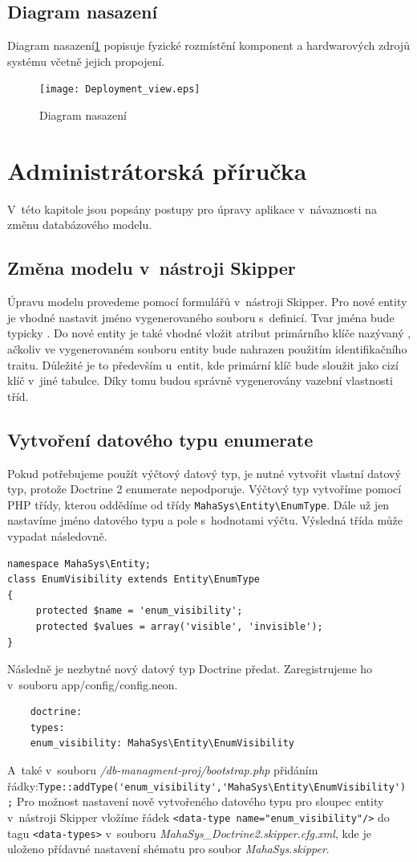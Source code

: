 \documentclass[thesis=B,czech]{FITthesis}[2012/06/26]
\begin{document}
\subsection{Diagram nasazení}
	Diagram nasazení\ref{deployment_view} popisuje fyzické rozmístění komponent a hardwarových zdrojů systému včetně jejich propojení.\cite{si1_pred7}

\begin{figure}
	\texttt{[image: Deployment\_view.eps]}
	\caption{Diagram nasazení}\label{deployment_view}
\end{figure}
	
\section{Administrátorská příručka}
	V~této kapitole jsou popsány postupy pro úpravy aplikace v~návaznosti na změnu databázového modelu.
\subsection{Změna modelu v~nástroji Skipper}
	Úpravu modelu provedeme pomocí formulářů v~nástroji Skipper. Pro nové entity je vhodné nastavit jméno vygenerovaného souboru s~definicí. Tvar jména bude typicky . Do nové entity je také vhodné vložit atribut primárního klíče nazývaný , ačkoliv ve vygenerovaném souboru entity bude nahrazen použitím identifikačního traitu. Důležité je to především u~entit, kde primární klíč bude sloužit jako cizí klíč v~jiné tabulce. Díky tomu budou správně vygenerovány vazební vlastnosti tříd.
\subsection{Vytvoření datového typu enumerate}
	Pokud potřebujeme použít výčtový datový typ, je nutné vytvořit vlastní datový typ, protože Doctrine 2 enumerate nepodporuje. Výčtový typ vytvoříme pomocí PHP třídy, kterou oddědíme od třídy \verb|MahaSys\Entity\EnumType|. Dále už jen nastavíme jméno datového typu a pole s~hodnotami výčtu. Výsledná třída může vypadat následovně.
	\begin{verbatim}
namespace MahaSys\Entity;
class EnumVisibility extends Entity\EnumType
{
     protected $name = 'enum_visibility';
     protected $values = array('visible', 'invisible');
}
	\end{verbatim}
	Následně je nezbytné nový datový typ Doctrine předat. Zaregistrujeme ho v~souboru app/config/config.neon.
	\begin{verbatim}
	doctrine:
	types: 
	enum_visibility: MahaSys\Entity\EnumVisibility
	\end{verbatim}
	A~také v~souboru \emph{/db-managment-proj/bootstrap.php} přidáním řádky:\newline\verb|Type::addType('enum_visibility','MahaSys\Entity\EnumVisibility');|
Pro možnost nastavení nově vytvořeného datového typu pro sloupec entity v~nástroji Skipper vložíme řádek \verb|<data-type name="enum_visibility"/>| do tagu \verb|<data-types>| v~souboru \emph{MahaSys\_Doctrine2.skipper.cfg.xml}, kde je uloženo přídavné nastavení shématu pro soubor \emph{MahaSys.skipper}.
\end{document}
